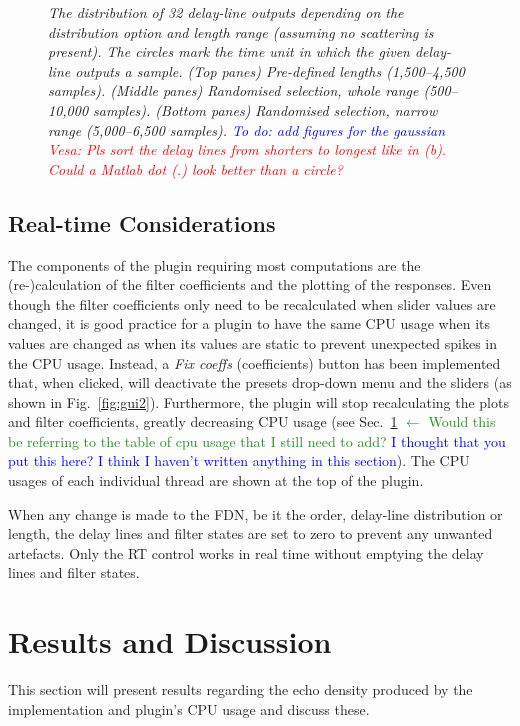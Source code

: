 \documentclass[twoside,a4paper]{article}
\newcommand{\silvin}[1]{\textcolor{ForestGreen}{#1}}
\newcommand{\karolina}[1]{\textcolor{blue}{#1}}
\newcommand{\vesa}[1]{\textcolor{red}{Vesa: #1}}
\begin{document}
\begin{figure}[t!]
    \caption{\textit{The distribution of 32 delay-line outputs depending on the distribution option and length range (assuming no scattering is present). The circles mark the time unit in which the given delay-line outputs a sample. (Top panes) Pre-defined lengths (1,500--4,500 samples). (Middle panes) Randomised selection, whole range (500--10,000 samples). (Bottom panes) Randomised selection, narrow range (5,000--6,500 samples). \karolina{To do: add figures for the gaussian}
    \vesa{Pls sort the delay lines from shorters to longest like in (b). Could a Matlab dot (.) look better than a circle?}}}
    \label{fig:dLens}
\end{figure}

\subsection{Real-time Considerations}
The components of the plugin requiring most computations are the (re-)calculation of the filter coefficients and the plotting of the responses. Even though the filter coefficients only need to be recalculated when slider values are changed, it is good practice for a plugin to have the same CPU usage when its values are changed as when its values are static to prevent unexpected spikes in the CPU usage. Instead, a \textit{Fix coeffs} (coefficients) button has been implemented that, when clicked, will deactivate the presets drop-down menu and the sliders (as shown in Fig.~\ref{fig:gui2}). Furthermore, the plugin will stop recalculating the plots and filter coefficients, greatly decreasing CPU usage (see Sec.~\ref{sec:resDisc} \silvin{$\leftarrow$ Would this be referring to the table of cpu usage that I still need to add?} \karolina{I thought that you put this here? I think I haven't written anything in this section}). The CPU usages of each individual thread are shown at the top of the plugin.

When any change is made to the FDN, be it the order, delay-line distribution or length, the delay lines and filter states are set to zero to prevent any unwanted artefacts. Only the RT control works in real time without emptying the delay lines and filter states.

\section{Results and Discussion}\label{sec:resDisc}

This section will present results regarding the echo density produced by the implementation and plugin's CPU usage and discuss these.
\end{document}
